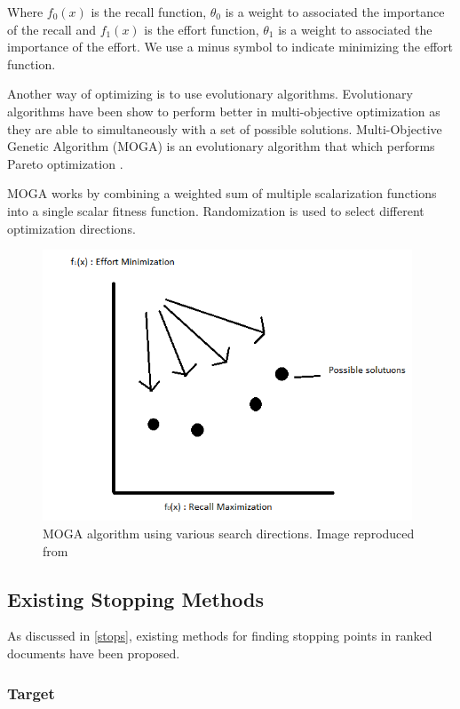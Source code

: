 Where $f_0(x)$ is the recall function, $\theta_{0}$ is a weight to associated the importance of the recall and $f_1(x)$ is the effort function, $\theta_{1}$ is a weight to associated the importance of the effort. We use a minus symbol to indicate minimizing the effort function.

Another way of optimizing is to use evolutionary algorithms. Evolutionary algorithms have been show to perform better in multi-objective optimization \cite{Chiandussi:2012:CMO:2133849.2134037} as they are able to simultaneously with a set of possible solutions. Multi-Objective Genetic Algorithm (MOGA) is an evolutionary algorithm that which performs Pareto optimization \cite{489161}.

MOGA works by combining a weighted sum of multiple scalarization functions into a single scalar fitness function. Randomization is used to select different optimization directions.

\begin{figure}[H]
\center
\includegraphics[width=11cm]{figures/MOGA.png}
\caption{MOGA algorithm using various search directions. Image reproduced from \cite{489161}}
\end{figure}


\subsection{Existing Stopping Methods} \label{methods}

As discussed in \ref{stops}, existing methods for finding stopping points in ranked documents have been proposed.

\subsubsection{Target} \label{target}

